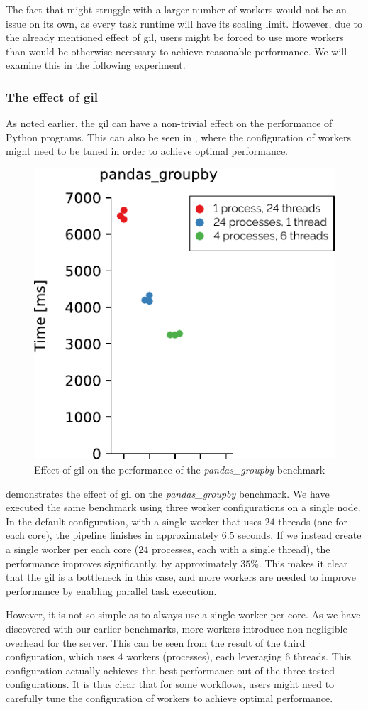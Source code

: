 The fact that \dask{} might struggle with a larger number of workers would not
be an issue on its own, as every task runtime will have its scaling limit. However, due to the
already mentioned effect of \gls{gil}, \dask{} users might be
forced to use more workers than would be otherwise necessary to achieve reasonable performance. We
will examine this in the following experiment.

\subsubsection*{The effect of \acrshort{gil}}
As noted earlier, the \gls{gil} can have a non-trivial effect on the performance
of Python programs. This can also be seen in \dask{}, where the configuration
of workers might need to be tuned in order to achieve optimal performance.

\begin{figure}
	\centering
	\includegraphics[width=0.3\linewidth]{./imgs/rsds/charts/dask-gil-scaling}
	\caption{Effect of \acrshort{gil} on the performance of the \emph{pandas\_groupby} benchmark}
	\label{fig:dask-gil-scaling}
\end{figure}

 demonstrates the effect of \gls{gil} on the
\emph{pandas\_groupby} benchmark. We have executed the same benchmark using three
\dask{} worker configurations on a single node. In the default configuration,
with a single worker that uses $24$ threads (one for each core), the pipeline
finishes in approximately $6.5$ seconds. If we instead create a single worker
per each core ($24$ processes, each with a single thread), the performance
improves significantly, by approximately $35\%$. This makes it clear that the
\gls{gil} is a bottleneck in this case, and more \dask{}
workers are needed to improve performance by enabling parallel task execution.

However, it is not so simple as to always use a single \dask{} worker per core.
As we have discovered with our earlier benchmarks, more workers introduce non-negligible overhead
for the \dask{} server. This can be seen from the result of the third
configuration, which uses $4$ \dask{} workers
(processes), each leveraging $6$ threads. This configuration actually
achieves the best performance out of the three tested configurations. It is thus clear that for
some \dask{} workflows, users might need to carefully tune the configuration of
workers to achieve optimal performance.

